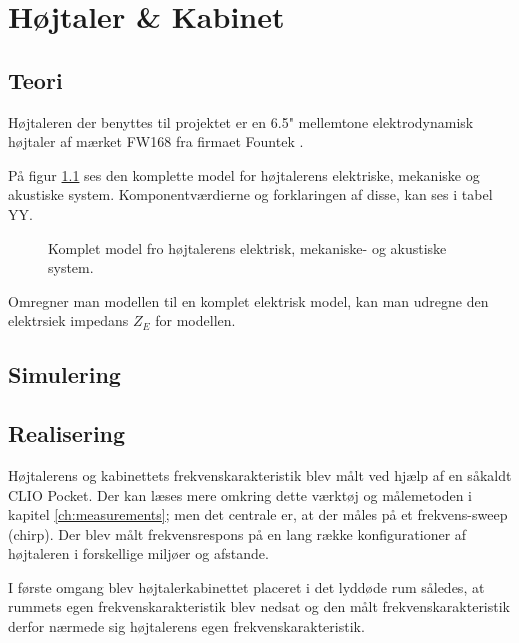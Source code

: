 \chapter{Højtaler \& Kabinet}

\section{Teori}
Højtaleren der benyttes til projektet er en 6.5" mellemtone elektrodynamisk højtaler af mærket FW168\cite{FW168} fra firmaet Fountek \cite{Fountek}. 

På figur \ref{fig:kompletmodel} ses den komplette model for højtalerens elektriske, mekaniske og akustiske system. Komponentværdierne og forklaringen af disse, kan ses i tabel YY.

\begin{figure}[H]
	\centering
	\label{fig:kompletmodel}
	\caption{Komplet model fro højtalerens elektrisk, mekaniske- og akustiske system. \cite{Elektroakustik}}
\end{figure}

Omregner man modellen til en komplet elektrisk model, kan man udregne den elektrsiek impedans $Z_E$ for modellen.

\section{Simulering}

\newpage
\section{Realisering}
Højtalerens og kabinettets frekvenskarakteristik blev målt ved hjælp af en såkaldt CLIO Pocket. Der kan læses mere omkring dette værktøj og målemetoden i kapitel \ref{ch:measurements}; men det centrale er, at der måles på et frekvens-sweep (chirp). Der blev målt frekvensrespons på en lang række konfigurationer af højtaleren i forskellige miljøer og afstande.

I første omgang blev højtalerkabinettet placeret i det lyddøde rum således, at rummets egen frekvenskarakteristik blev nedsat og den målt frekvenskarakteristik derfor nærmede sig højtalerens egen frekvenskarakteristik.


